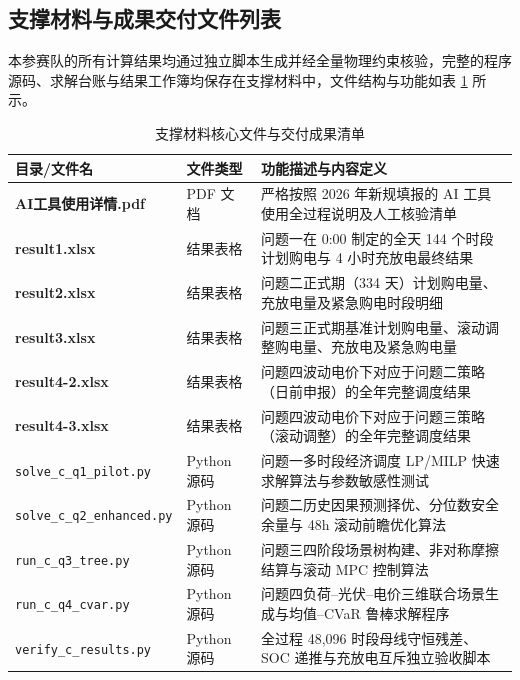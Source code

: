 \documentclass[withoutpreface]{cumcmthesis}
\begin{document}
\clearpage
\begin{appendices}

\section{支撑材料与成果交付文件列表}

本参赛队的所有计算结果均通过独立脚本生成并经全量物理约束核验，完整的程序源码、求解台账与结果工作簿均保存在支撑材料中，文件结构与功能如表 \ref{tab:app_files} 所示。

\begin{table}[htbp]
\centering
\small
\renewcommand{\arraystretch}{1.25}
\caption{支撑材料核心文件与交付成果清单}
\label{tab:app_files}
\begin{tabular*}{\textwidth}{p{} p{} p{}}
\toprule[1.5pt]
目录/文件名 & 文件类型 & 功能描述与内容定义 \\
\midrule[1pt]
\textbf{AI工具使用详情.pdf} & PDF 文档 & 严格按照 2026 年新规填报的 AI 工具使用全过程说明及人工核验清单 \\
\textbf{result1.xlsx}       & 结果表格 & 问题一在 0:00 制定的全天 144 个时段计划购电与 4 小时充放电最终结果 \\
\textbf{result2.xlsx}       & 结果表格 & 问题二正式期（334 天）计划购电量、充放电量及紧急购电时段明细 \\
\textbf{result3.xlsx}       & 结果表格 & 问题三正式期基准计划购电量、滚动调整购电量、充放电及紧急购电量 \\
\textbf{result4-2.xlsx}     & 结果表格 & 问题四波动电价下对应于问题二策略（日前申报）的全年完整调度结果 \\
\textbf{result4-3.xlsx}     & 结果表格 & 问题四波动电价下对应于问题三策略（滚动调整）的全年完整调度结果 \\
\midrule[0.5pt]
\texttt{solve\_c\_q1\_pilot.py}    & Python 源码 & 问题一多时段经济调度 LP/MILP 快速求解算法与参数敏感性测试 \\
\texttt{solve\_c\_q2\_enhanced.py} & Python 源码 & 问题二历史因果预测择优、分位数安全余量与 48h 滚动前瞻优化算法 \\
\texttt{run\_c\_q3\_tree.py}       & Python 源码 & 问题三四阶段场景树构建、非对称摩擦结算与滚动 MPC 控制算法 \\
\texttt{run\_c\_q4\_cvar.py}       & Python 源码 & 问题四负荷--光伏--电价三维联合场景生成与均值--CVaR 鲁棒求解程序 \\
\texttt{verify\_c\_results.py}     & Python 源码 & 全过程 48,096 时段母线守恒残差、SOC 递推与充放电互斥独立验收脚本 \\
\bottomrule[1.5pt]
\end{tabular*}
\end{table}
\normalsize


\end{appendices}
\end{document}
